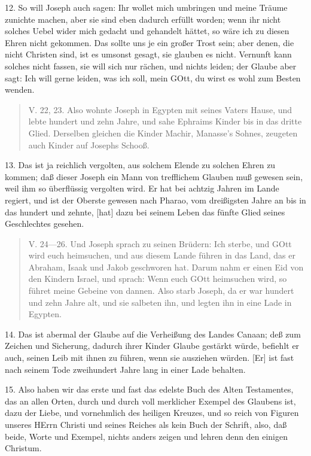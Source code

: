 12. So will Joseph auch sagen: Ihr wollet mich umbringen und meine Träume zunichte machen, aber sie sind eben dadurch erfüllt worden; wenn ihr nicht solches Uebel wider mich gedacht und gehandelt hättet, so wäre ich zu diesen Ehren nicht gekommen. Das sollte uns je ein großer Trost sein; aber denen, die nicht Christen sind, ist es umsonst gesagt, sie glauben es nicht. Vernunft kann solches nicht fassen, sie will sich nur rächen, und nichts leiden; der Glaube aber sagt: Ich will gerne leiden, was ich soll, mein GOtt, du wirst es wohl zum Besten wenden.

\begin{quote}
V. 22, 23. Also wohnte Joseph in Egypten mit seines Vaters Hause, und lebte hundert und zehn Jahre, und sahe Ephraims Kinder bis in das dritte Glied. Derselben gleichen die Kinder Machir, Manasse’s Sohnes, zeugeten auch Kinder auf Josephs Schooß.
\end{quote}

13. Das ist ja reichlich vergolten, aus solchem Elende zu solchen Ehren zu kommen; daß dieser Joseph ein Mann von trefflichem Glauben muß gewesen sein, weil ihm so überflüssig vergolten wird. Er hat bei achtzig Jahren im Lande regiert, und ist der Oberste gewesen nach Pharao, vom dreißigsten Jahre an bis in das hundert und zehnte, [hat] dazu bei seinem Leben das fünfte Glied seines Geschlechtes gesehen.

\begin{quote}
V. 24—26. Und Joseph sprach zu seinen Brüdern: Ich sterbe, und GOtt wird euch heimsuchen, und aus diesem Lande führen in das Land, das er Abraham, Isaak und Jakob geschworen hat. Darum nahm er einen Eid von den Kindern Israel, und sprach: Wenn euch GOtt heimsuchen wird, so führet meine Gebeine von dannen. Also starb Joseph, da er war hundert und zehn Jahre alt, und sie salbeten ihn, und legten ihn in eine Lade in Egypten.
\end{quote}

14. Das ist abermal der Glaube auf die Verheißung des Landes Canaan; deß zum Zeichen und Sicherung, dadurch ihrer Kinder Glaube gestärkt würde, befiehlt er auch, seinen Leib mit ihnen zu führen, wenn sie ausziehen würden. [Er] ist fast nach seinem Tode zweihundert Jahre lang in einer Lade behalten.

15. Also haben wir das erste und fast das edelste Buch des Alten Testamentes, das an allen Orten, durch und durch voll merklicher Exempel des Glaubens ist, dazu der Liebe, und vornehmlich des heiligen Kreuzes, und so reich von Figuren unseres HErrn Christi und seines Reiches als kein Buch der Schrift, also, daß beide, Worte und Exempel, nichts anders zeigen und lehren denn den einigen Christum.

